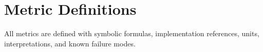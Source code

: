 \section{Metric Definitions}
\label{app:metrics}


All metrics are defined with symbolic formulas, implementation references,
units, interpretations, and known failure modes.
